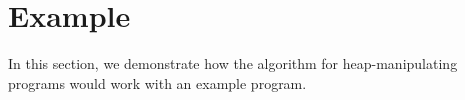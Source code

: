 
\section{Example}
\label{sec:example}
%

In this section, we demonstrate how the \impact algorithm for heap-manipulating programs would work with an example program.
